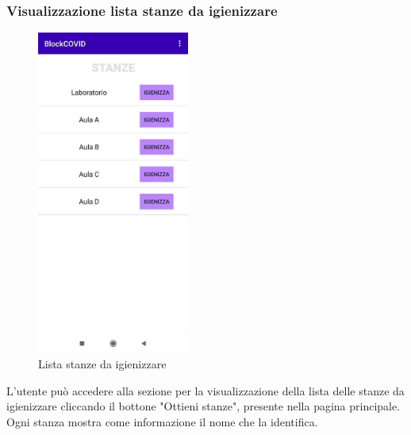	\subsubsection{Visualizzazione lista stanze da igienizzare}
	\begin{figure}[H]
		\centering
		\includegraphics[width=5cm]{res/images/stanzeDaIgienizzareAddetto.png}
		\caption{Lista stanze da igienizzare}
	\end{figure}
	L’utente può accedere alla sezione per la visualizzazione della lista delle stanze da igienizzare cliccando il bottone "Ottieni stanze", presente nella pagina principale.
	Ogni stanza mostra come informazione il nome che la identifica.
	
